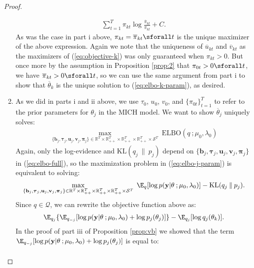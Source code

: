 \begin{proof}
\begin{enumerate}[label=\roman*.]
\begin{align*}
    \sum_{t=1}^T \pi_{kt} \log \frac{\overline{\pi}_{kt}}{\pi_{kt}} +C.
\end{align*}
As was the case in part i above, $\pi_{kt} = \overline{\pi}_{kt} \sforall t$ is the unique maximizer of the above expression. Again we note that the uniqueness of $\overline{u}_{kt}$ and $\overline{v}_{kt}$ as the maximizers of (\ref{eq:objective-k}) was only guaranteed when $\pi_{kt} > 0$. But once more by the assumption in Proposition \ref{prop:2} that $\pi_{0t} >0 \sforall t$, we have $\overline{\pi}_{kt} > 0 \sforall t$, so we can use the same argument from part i to show that $\overline{\theta}_k$ is the unique solution to (\ref{eq:elbo-k-param}), as desired.

\item As we did in parts i and ii above, we use $\tau_0$, $u_0$, $v_0$, and $\{\pi_{0t}\}_{t=1}^T$ to refer to the prior parameters for $\theta_j$ in the MICH model. We want to show $\overline{\theta}_j$ uniquely solves: 
\begin{align}
     \max_{\{\mathbf{b}_j, \boldsymbol{\tau}_j, \mathbf{u}_j, \mathbf{v}_j, \boldsymbol{\pi}_j\} \in \mathbb{R}^T\times\mathbb{R}_{++}^T\times\mathbb{R}_{++}^T\times\mathbb{R}_{++}^T \times\mathcal{S}^T} \;  \text{ELBO}(q\:;\mu_0,\lambda_0) \label{eq:elbo-j-param}
\end{align}
Again, only the log-evidence and $\text{KL}(q_j\:\lVert\: p_j)$ depend on $\{\mathbf{b}_j, \boldsymbol{\tau}_j, \mathbf{u}_j, \mathbf{v}_j, \boldsymbol{\pi}_j\}$ in (\ref{eq:elbo-full}), so the maximization problem in (\ref{eq:elbo-j-param}) is equivalent to solving: 
\begin{align*}
     \max_{\{\mathbf{b}_j, \boldsymbol{\tau}_j, \mathbf{u}_j, \mathbf{v}_j, \boldsymbol{\pi}_j\} \in \mathbb{R}^T\times\mathbb{R}_{++}^T\times\mathbb{R}_{++}^T\times\mathbb{R}_{++}^T \times\mathcal{S}^T} \;  \E_q[\log p(\mathbf{y}| \theta\:; \mu_0,\lambda_0)] - \text{KL}(q_j\:\lVert\: p_j).
\end{align*}
Since $q \in \mathcal{Q}$, we can rewrite the objective function above as:
\begin{align*}
    \E_{q_j}\{\E_{q_{-j}}[\log p(\mathbf{y}| \theta\:; \mu_0,\lambda_0)+\log p_j(\theta_j)]\} - \E_{q_j}[\log q_j(\theta_k)].
\end{align*}
In the proof of part iii of Proposition \ref{prop:vb} we showed that the term $\E_{q_{-j}}[\log p(\mathbf{y}| \theta\:; \mu_0,\lambda_0)+\log p_j(\theta_j)]$ is equal to:
\small
\begin{align*}

\end{align*}
\end{enumerate}
\end{proof}
